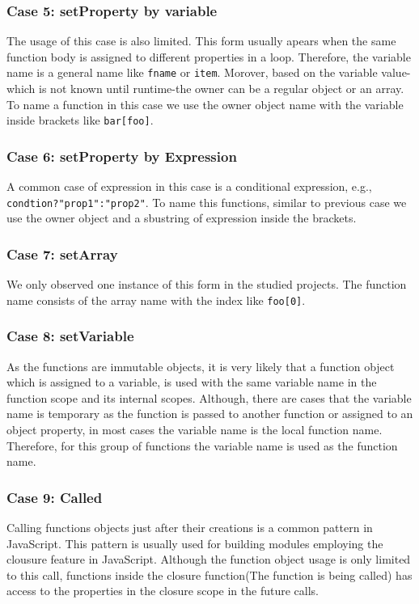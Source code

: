 \documentclass[10pt, preprint]{sigplanconf}
\begin{document}
{\subsubsection{Case 5: setProperty by variable}
The usage of this case is also limited. This form usually apears when the same function body is assigned to different properties in a loop. Therefore, the variable
 name is a general name like {\small\texttt{fname}} or {\small\texttt{item}}. Morover, based on the variable value-which is not known until runtime-the owner can be a    regular object or an array. To name a function in this case we use the owner object name with the variable inside brackets like {\small\texttt{bar[foo]}}.

\subsubsection{Case 6: setProperty by Expression}
 A common case of expression in this case is a conditional expression, e.g., {\small\texttt{condtion?"prop1":"prop2"}}. To name this functions, similar to previous case we use the owner object and a sbustring of expression inside the brackets.
 

\subsubsection{Case 7: setArray}
We only observed one instance of this form in the studied projects. The function name consists of the array name with the index like {\small\texttt{foo[0]}}.

\subsubsection{Case 8: setVariable }
As the functions are immutable objects, it is very likely that a function object which is assigned to a variable, is used with the same variable name in the function scope
and its internal scopes. Although, there are cases that the variable name is temporary as the function is passed to another function or assigned to an object property, in most cases the variable name is the local function name. Therefore, for this group of functions the variable name is used as the function name.

\subsubsection{Case 9: Called}
Calling functions objects just after their creations is a common pattern in JavaScript. This pattern is usually used for building modules employing the clousure feature in JavaScript. Although the function object usage is only limited to this call, functions inside the closure function(The function is being called) has access to the properties in the closure scope in the future calls. 

}
\end{document}
